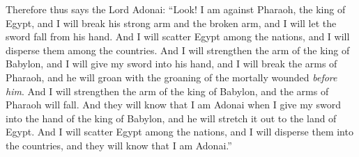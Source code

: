 \begin{biblechapter}
\verse Therefore thus says the Lord Adonai: “Look! I am against Pharaoh, the king of Egypt, and I will break his strong arm and the broken arm, and I will let the sword fall from his hand.
\verse And I will scatter Egypt among the nations, and I will disperse them among the countries.
\verse And I will strengthen the arm of the king of Babylon, and I will give my sword into his hand, and I will break the arms of Pharaoh, and he will groan with the groaning of the mortally wounded \textit{before him}.
\verse And I will strengthen the arm of the king of Babylon, and the arms of Pharaoh will fall. And they will know that I am Adonai when I give my sword into the hand of the king of Babylon, and he will stretch it out to the land of Egypt.
\verse And I will scatter Egypt among the nations, and I will disperse them into the countries, and they will know that I am Adonai.”
\end{biblechapter}

